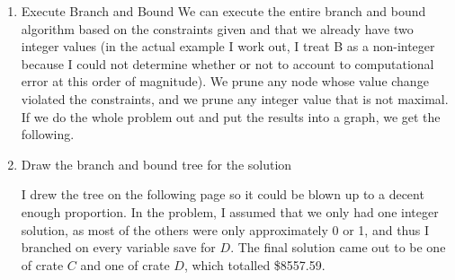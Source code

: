 \documentclass[11pt]{article}
\begin{document}
\begin{enumerate}
\begin{enumerate}
    \item Execute Branch and Bound
        We can execute the entire branch and bound algorithm based on the
        constraints given and that we already have two integer values (in the
        actual example I work out, I treat B as a non-integer because I could
        not determine whether or not to account to computational error at this
        order of magnitude). We prune any node whose value change violated the
        constraints, and we prune any integer value that is not maximal. If we
        do the whole problem out and put the results into a graph, we get the
        following.

    \item Draw the branch and bound tree for the solution

        I drew the tree on the following page so it could be blown up to a
        decent enough proportion. In the problem, I assumed that we only had
        one integer solution, as most of the others were only approximately 0
        or 1, and thus I branched on every variable save for $D$. The final
        solution came out to be one of crate $C$ and one of crate $D$, which
        totalled \$8557.59.


\end{enumerate}
\end{enumerate}
\end{document}
